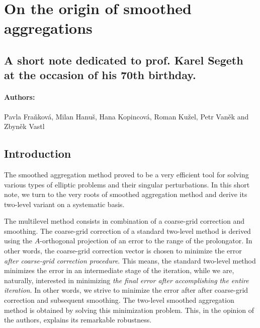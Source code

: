 \chapter{On the origin of smoothed aggregations}\label{app:multigrid}

\section*{A short note dedicated to prof. Karel Segeth at the occasion of his 70th birthday.}

\subsubsection*{Authors:}

Pavla Fra\v{n}kov\'{a}, Milan Hanu\v{s},
Hana Kopincov\'{a}, Roman Ku\v{z}el,
Petr Van\v{e}k and Zbyn\v{e}k Vastl















\section{Introduction}
The smoothed aggregation method
\cite{vanek-accel,FMS,amg-theory,Vanek_Mandel_Brezina_1995} proved
to be a very efficient tool for solving various types
of elliptic problems and their singular perturbations.
In this short note, we turn
to the very roots of smoothed aggregation method and derive its
two-level variant on a systematic basis.

The multilevel method consists in combination of a coarse-grid correction
and smoothing.
The coarse-grid correction of a standard
two-level method is derived using the $A$-orthogonal projection of an
error to the range of the prolongator.
In other words, the coarse-grid correction
vector
is chosen to minimize the error {\em after coarse-grid correction procedure}.
This means, the standard two-level method
minimizes the error in an intermediate stage of the iteration, while
we are, naturally, interested in
minimizing  {\em the final error after accomplishing the entire iteration}.
In other words, we strive to minimize the error after
after coarse-grid correction and
subsequent smoothing. The two-level smoothed aggregation method
is obtained by solving this minimization problem. This, in the opinion
of the authors, explains its remarkable robustness.

